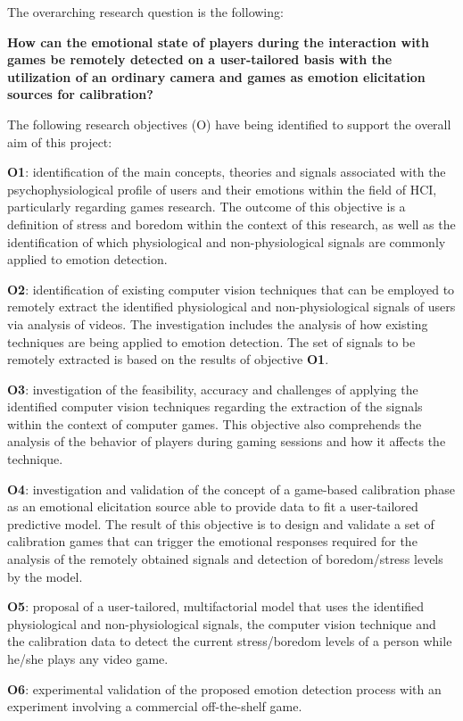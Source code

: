 The overarching research question is the following:

\textbf{How can the emotional state of players during the interaction with games be remotely detected on a user-tailored basis with the utilization of an ordinary camera and games as emotion elicitation sources for calibration?}

The following research objectives (O) have being identified to support the overall aim of this project:

\textbf{O1}: identification of the main concepts, theories and signals associated with the psychophysiological profile of users and their emotions within the field of HCI, particularly regarding games research. The outcome of this objective is a definition of stress and boredom within the context of this research, as well as the identification of which physiological and non-physiological signals are commonly applied to emotion detection.

\textbf{O2}: identification of existing computer vision techniques that can be employed to remotely extract the identified physiological and non-physiological signals of users via analysis of videos. The investigation includes the analysis of how existing techniques are being applied to emotion detection. The set of signals to be remotely extracted is based on the results of objective \textbf{O1}.

\textbf{O3}: investigation of the feasibility, accuracy and challenges of applying the identified computer vision techniques regarding the extraction of the signals within the context of computer games. This objective also comprehends the analysis of the behavior of players during gaming sessions and how it affects the technique.

\textbf{O4}: investigation and validation of the concept of a game-based calibration phase as an emotional elicitation source able to provide data to fit a user-tailored predictive model. The result of this objective is to design and validate a set of calibration games that can trigger the emotional responses required for the analysis of the remotely obtained signals and detection of boredom/stress levels by the model.

\textbf{O5}: proposal of a user-tailored, multifactorial model that uses the identified physiological and non-physiological signals, the computer vision technique and the calibration data to detect the current stress/boredom levels of a person while he/she plays any video game.

\textbf{O6}: experimental validation of the proposed emotion detection process with an experiment involving a commercial off-the-shelf game.

